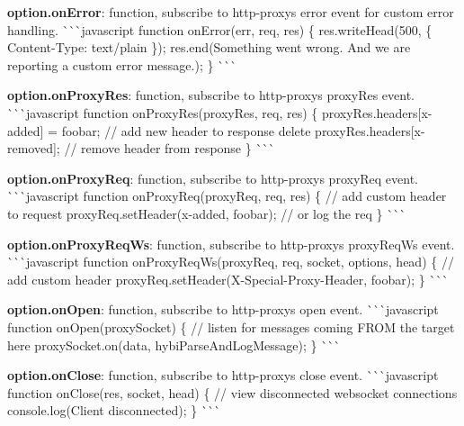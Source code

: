 \begin{DoxyItemize}
\item {\bfseries option.\+on\+Error}\+: function, subscribe to http-\/proxy\textquotesingle{}s {\ttfamily error} event for custom error handling. \`{}\`{}\`{}javascript function on\+Error(err, req, res) \{ res.\+write\+Head(500, \{ \textquotesingle{}Content-\/\+Type\textquotesingle{}\+: \textquotesingle{}text/plain\textquotesingle{} \}); res.\+end(\textquotesingle{}Something went wrong. And we are reporting a custom error message.\textquotesingle{}); \} \`{}\`{}\`{}
\item {\bfseries option.\+on\+Proxy\+Res}\+: function, subscribe to http-\/proxy\textquotesingle{}s {\ttfamily proxy\+Res} event. \`{}\`{}\`{}javascript function on\+Proxy\+Res(proxy\+Res, req, res) \{ proxy\+Res.\+headers\mbox{[}\textquotesingle{}x-\/added\textquotesingle{}\mbox{]} = \textquotesingle{}foobar\textquotesingle{}; // add new header to response delete proxy\+Res.\+headers\mbox{[}\textquotesingle{}x-\/removed\textquotesingle{}\mbox{]}; // remove header from response \} \`{}\`{}\`{}
\item {\bfseries option.\+on\+Proxy\+Req}\+: function, subscribe to http-\/proxy\textquotesingle{}s {\ttfamily proxy\+Req} event. \`{}\`{}\`{}javascript function on\+Proxy\+Req(proxy\+Req, req, res) \{ // add custom header to request proxy\+Req.\+set\+Header(\textquotesingle{}x-\/added\textquotesingle{}, \textquotesingle{}foobar\textquotesingle{}); // or log the req \} \`{}\`{}\`{}
\item {\bfseries option.\+on\+Proxy\+Req\+Ws}\+: function, subscribe to http-\/proxy\textquotesingle{}s {\ttfamily proxy\+Req\+Ws} event. \`{}\`{}\`{}javascript function on\+Proxy\+Req\+Ws(proxy\+Req, req, socket, options, head) \{ // add custom header proxy\+Req.\+set\+Header(\textquotesingle{}X-\/\+Special-\/\+Proxy-\/\+Header\textquotesingle{}, \textquotesingle{}foobar\textquotesingle{}); \} \`{}\`{}\`{}
\item {\bfseries option.\+on\+Open}\+: function, subscribe to http-\/proxy\textquotesingle{}s {\ttfamily open} event. \`{}\`{}\`{}javascript function on\+Open(proxy\+Socket) \{ // listen for messages coming F\+R\+OM the target here proxy\+Socket.\+on(\textquotesingle{}data\textquotesingle{}, hybi\+Parse\+And\+Log\+Message); \} \`{}\`{}\`{}
\item {\bfseries option.\+on\+Close}\+: function, subscribe to http-\/proxy\textquotesingle{}s {\ttfamily close} event. \`{}\`{}\`{}javascript function on\+Close(res, socket, head) \{ // view disconnected websocket connections console.\+log(\textquotesingle{}Client disconnected\textquotesingle{}); \} \`{}\`{}\`{}
\end{DoxyItemize}


